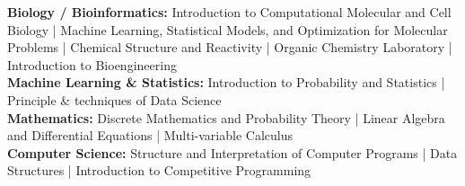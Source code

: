 \newcommand{\coursework}[2]{
    \vspace{4pt}
    \textbf{#1:} #2 \\
}

\coursework{Biology / Bioinformatics}{Introduction to Computational Molecular and Cell Biology | Machine Learning, Statistical Models, and Optimization for Molecular Problems | Chemical Structure and Reactivity | Organic Chemistry Laboratory | Introduction to Bioengineering}

\coursework{Machine Learning \& Statistics}{Introduction to Probability and Statistics | Principle \& techniques of Data Science}

\coursework{Mathematics}{Discrete Mathematics and Probability Theory | Linear Algebra and Differential Equations | Multi-variable Calculus}

\coursework{Computer Science}{Structure and Interpretation of Computer Programs | Data Structures | Introduction to Competitive Programming}
